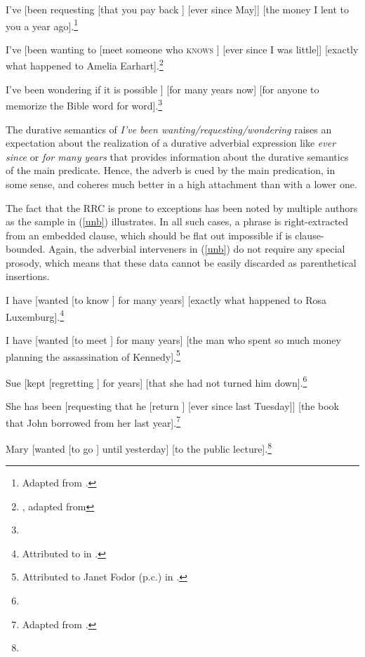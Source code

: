 \documentclass[output=paper,biblatex,babelshorthands,newtxmath,draftmode,colorlinks,citecolor=brown]{langscibook}
\begin{document}
\eal \label{longb}
\ex  I've [been requesting [that you pay back \spc] [ever since May]] [the money
I lent to you a year ago].\footnote{
  Adapted from .
}

\ex I've [been wanting to [meet someone who \textsc{knows} \spc] [ever since I was little]] [exactly what happened to Amelia
Earhart].\footnote{
  , adapted from 
}

\ex  I've been wondering  if it is possible   \spc]
[for many years now] [for anyone to memorize the Bible word for word].\footnote{
}
\zl


\noindent
The durative semantics of \emph{I've been wanting/requesting/wondering} raises an expectation about
the realization of a durative adverbial expression like \emph{ever since} or \emph{for many years}
that provides information about the durative semantics of the main predicate.  Hence, the adverb is
cued by the main predication, in some sense, and coheres much better in a high attachment than with
a lower one.

The fact that the RRC is prone to exceptions has been noted by multiple authors as the sample in
(\ref{unb}) illustrates. In all such cases, a phrase is right-extracted from an embedded clause,
which should be flat out impossible if  is clause-bounded. Again, the adverbial
interveners in (\ref{unb}) do not require any special prosody, which means that these data cannot be
easily discarded as parenthetical insertions.
  
\eal \label{unb}
\ex I have  [wanted [to know \spc] for many years] [exactly what happened to Rosa Luxemburg].\footnote{
Attributed to  in .}

\ex I have  [wanted [to meet \spc] for many years] [the man who spent so much money planning the assassination of Kennedy].\footnote{
Attributed to Janet Fodor (p.c.) in .}

\ex Sue [kept [regretting \spc] for years] [that she had not turned
him down].\footnote{
}

\ex She has been [requesting that he [return \spc] [ever since last Tuesday]] [the book
that John borrowed from her last year].\footnote{
Adapted from .
}

\ex  Mary [wanted [to go \spc] until yesterday]  [to the public lecture].\footnote{}
\zl
\end{document}
